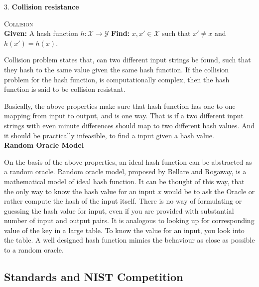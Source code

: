 \documentclass[12pt]{artikel3}                  %
\begin{document}
  3. {\bf Collision resistance}
  \begin{center}
    \framebox
    {
      \parbox{350pt}
      {
        \centering \textsc{Collision} \\
        {\bf Given:} A hash function $h : \mathcal{X} \to \mathcal{Y}$ 
        {\bf Find:} $x, x' \in \mathcal{X}$ such that $x' \neq x$ and $h(x') = h(x)$. 
      }
    }
  \end{center}
  \vspace{4mm}

  Collision problem states that, can two different input strings be found, such that they hash to the
  same value given the same hash function. If the collision problem for the hash function, is computationally
  complex, then the hash function is said to be collision resistant.

  Basically, the above properties make sure that hash function has one to one mapping from input to
  output, and is one way. That is if a two different input strings with even minute differences should
  map to two different hash values. And it should be practically infeasible, to find a input given a
  hash value. \\

  {\bf Random Oracle Model}

  On the basis of the above properties, an ideal hash function can be abstracted as a random oracle.
  Random oracle model, proposed by Bellare and Rogaway, is a mathematical model of ideal hash function.
  It can be thought of this way, that the only way to know the hash value for an input $x$ would be to
  ask the Oracle or rather compute the hash of the input itself. There is no way of formulating or 
  guessing the hash value for input, even if you are provided with substantial number of input and output
  pairs. It is analogous to looking up for corresponding value of the key in a large table. To know the
  value for an input, you look into the table. A well designed hash function mimics the behaviour as 
  close as possible to a random oracle.


  \clearpage

  \subsection{Standards and NIST Competition} 
\end{document}
